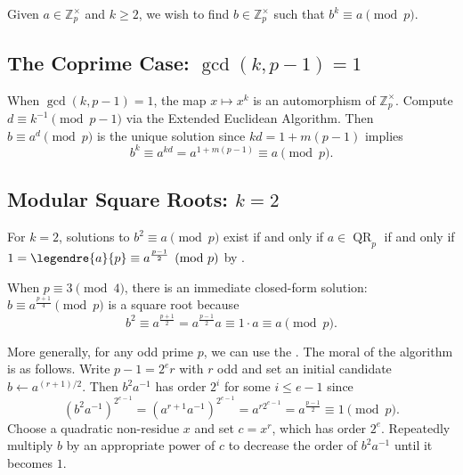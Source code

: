 Given \(a \in \mathbb{Z}_p^\times\) and \(k \geq 2\), we wish to find \(b \in \mathbb{Z}_p^\times\) such that \(b^k \equiv a \pmod{p}\).

\subsection*{The Coprime Case: \texorpdfstring{$\gcd(k, p-1) = 1$}{gcd(k, p-1) = 1}}

When \(\gcd(k, p-1) = 1\), the map \(x \mapsto x^k\) is an automorphism of \(\mathbb{Z}_p^\times\).
Compute \(d \equiv k^{-1} \pmod{p-1}\) via the Extended Euclidean Algorithm.
Then \(b \equiv a^d \pmod{p}\) is the unique solution since \(kd = 1 + m(p-1)\) implies
\[
    b^k \equiv a^{kd} = a^{1 + m(p-1)} \equiv a \pmod{p}.
\]

\subsection*{Modular Square Roots: \texorpdfstring{$k = 2$}{k = 2}}

For \(k = 2\), solutions to \(b^2 \equiv a \pmod{p}\) exist if and only if \(a \in \operatorname{QR}_p\) if and only if \(1 = \legendre{a}{p} \equiv a^{\frac{p-1}{2}} \pmod{p}\) by .

When \(p \equiv 3 \pmod{4}\), there is an immediate closed-form solution: \(b \equiv a^{\frac{p+1}{4}} \pmod{p}\) is a square root because
\[
    b^2 \equiv a^{\frac{p+1}{2}} = a^{\frac{p-1}{2}} a \equiv 1 \cdot a \equiv a \pmod{p}.
\]

More generally, for any odd prime \(p\), we can use the \emph{}.
The moral of the algorithm is as follows.
Write \(p - 1 = 2^e r\) with \(r\) odd and set an initial candidate \(b \gets a^{(r+1)/2}\).
Then \(b^2a^{-1}\) has order \(2^i\) for some \(i \leq e - 1\) since
\[
    (b^2 a^{-1})^{2^{e-1}} = (a^{r+1} a^{-1})^{2^{e-1}} = a^{r 2^{e-1}} = a^{\frac{p-1}{2}} \equiv 1 \pmod{p}.
\]
Choose a quadratic non-residue \(x\) and set \(c = x^r\), which has order \(2^e\).
Repeatedly multiply \(b\) by an appropriate power of \(c\) to decrease the order of \(b^2a^{-1}\) until it becomes \(1\).

